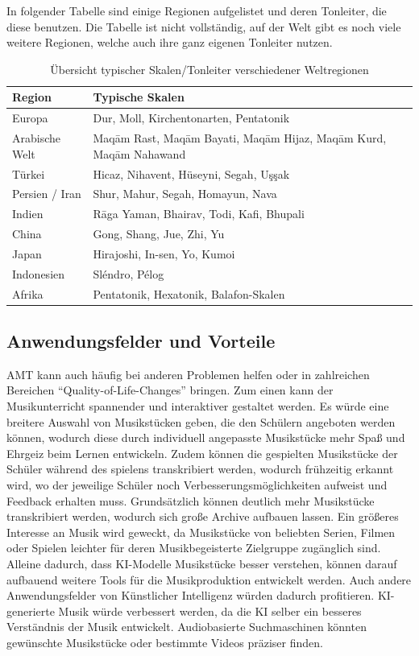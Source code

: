 In folgender Tabelle sind einige Regionen aufgelistet und deren Tonleiter, die diese benutzen.
Die Tabelle ist nicht vollständig, auf der Welt gibt es noch viele weitere Regionen, welche auch ihre ganz eigenen Tonleiter nutzen.

\begin{table}[H]
    \centering
    \begin{tabular}{|l|p{10cm}|}
    \hline
    \textbf{Region} & \textbf{Typische Skalen} \\ \hline
    Europa & Dur, Moll, Kirchentonarten, Pentatonik \\
    \hline
    Arabische Welt & Maqām Rast, Maqām Bayati, Maqām Hijaz, Maqām Kurd, Maqām Nahawand \\
    \hline
    Türkei & Hicaz, Nihavent, Hüseyni, Segah, Uşşak \\
    \hline
    Persien / Iran & Shur, Mahur, Segah, Homayun, Nava \\
    \hline
    Indien & Rāga Yaman, Bhairav, Todi, Kafi, Bhupali \\
    \hline
    China & Gong, Shang, Jue, Zhi, Yu \\
    \hline
    Japan & Hirajoshi, In-sen, Yo, Kumoi \\
    \hline
    Indonesien & Sléndro, Pélog \\
    \hline
    Afrika & Pentatonik, Hexatonik, Balafon-Skalen \\
    \hline
    \end{tabular}
    \caption{Übersicht typischer Skalen/Tonleiter verschiedener Weltregionen}
\end{table}

\subsection{Anwendungsfelder und Vorteile}\label{subsec:praktisch}
AMT kann auch häufig bei anderen Problemen helfen
oder in zahlreichen Bereichen \enquote{Quality-of-Life-Changes} bringen.
Zum einen kann der Musikunterricht spannender und interaktiver gestaltet werden.
Es würde eine breitere Auswahl von Musikstücken geben, die den Schülern angeboten werden können,
wodurch diese durch individuell angepasste Musikstücke mehr Spaß und Ehrgeiz beim Lernen entwickeln.
Zudem können die gespielten Musikstücke der Schüler während des spielens transkribiert werden,
wodurch frühzeitig erkannt wird, wo der jeweilige Schüler noch Verbesserungsmöglichkeiten aufweist und Feedback erhalten muss.
Grundsätzlich können deutlich mehr Musikstücke transkribiert werden,
wodurch sich große Archive aufbauen lassen.
Ein größeres Interesse an Musik wird geweckt, da Musikstücke von beliebten Serien, Filmen oder Spielen
leichter für deren Musikbegeisterte Zielgruppe zugänglich sind.
Alleine dadurch, dass KI-Modelle Musikstücke besser verstehen,
können darauf aufbauend weitere Tools für die Musikproduktion entwickelt werden.
Auch andere Anwendungsfelder von Künstlicher Intelligenz würden dadurch profitieren.
KI-generierte Musik würde verbessert werden, da die KI selber ein besseres Verständnis der Musik entwickelt.
Audiobasierte Suchmaschinen könnten gewünschte Musikstücke oder bestimmte Videos präziser finden.

